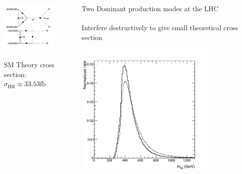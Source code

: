 \documentclass{beamer}
\newcommand*{\header}[1]{\fontsize{16}{8}\selectfont \textbf{{\color{MyPurple}{#1}}}}
\begin{document}
\begin{frame}
\begin{center}
\header{Higgs Self-Coupling}
\end{center}
\begin{columns}
\begin{column}{0.5\textwidth}
\begin{center}
\includegraphics[width=0.75\textwidth]{figures/sm_fey}\\~\\
SM Theory cross section:\\
\small$\sigma_{\mathrm{HH}} \approx 33.53\mathrm{fb}$
\end{center}
\end{column}
\begin{column}{0.5\textwidth}
Two Dominant production modes at the LHC\\~\\
Interfere destructively to give small theoretical cross section\\
\begin{center}
\includegraphics[width=0.75\textwidth]{figures/SM_continuum}
\end{center}
\end{column}
\end{columns}
\end{frame}
\end{document}
